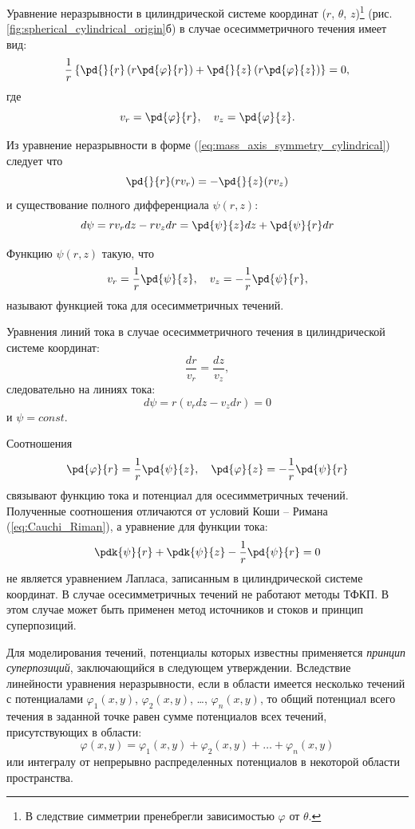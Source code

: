 \documentclass[a4paper, 14pt]{extarticle}
\begin{document}
Уравнение неразрывности в цилиндрической системе координат ($r$, $\theta$, $z$)\footnote{В следствие симметрии пренебрегли зависимостью $\varphi$ от $\theta$.} (рис. \ref{fig:spherical_cylindrical_origin}б) в случае осесимметричного течения имеет вид:
\begin{equation}
\label{eq:mass_axis_symmetry_cylindrical}
\frac{1}{r}
\left\{
\pd{}{r}\left( r \pd{\varphi}{r} \right) + 
\pd{}{z}\left( r \pd{\varphi}{z} \right)
\right\}
= 0,
\end{equation}
где
\[
v_r = \pd{\varphi}{r},\quad
v_z =  \pd{\varphi}{z}.
\]

Из уравнение неразрывности в форме (\ref{eq:mass_axis_symmetry_cylindrical}) следует что
\[
	\pd{}{r}(r v_r)  = -\pd{}{z}(r v_z)
\]	
и существование полного дифференциала $\psi(r,z)$:
\[
	d\psi = r v_r dz - r v_z dr = \pd{\psi}{z} dz + \pd{\psi}{r} dr
\]


\begin{dfn}
Функцию $\psi(r,z)$  такую, что
\[
	v_r = \displaystyle\frac{1}{r}\pd{\psi}{z},\quad
	v_z = -\displaystyle\frac{1}{r}\pd{\psi}{r},
\]
называют \alert{функцией тока для осесимметричных течений}.	
\end{dfn}

Уравнения линий тока в случае осесимметричного течения в цилиндрической системе координат:
\[
\frac{dr}{v_r} = \frac{dz}{v_z},
\]
следовательно на линиях тока:
\[
d\psi = r (v_r dz - v_z dr) = 0
\]
и $\psi = const$.

Соотношения
\[
	\pd{\varphi}{r} = \frac{1}{r}\pd{\psi}{z},\quad
	\pd{\varphi}{z} = -\frac{1}{r}\pd{\psi}{r}
\]
связывают функцию тока и потенциал для осесимметричных течений. Полученные соотношения \alert{отличаются} от условий Коши -- Римана (\ref{eq:Cauchi_Riman}), а уравнение для функции тока:
\[
	\pdk{\psi}{r}+\pdk{\psi}{z} - \frac{1}{r}\pd{\psi}{r} = 0
\]
не является уравнением Лапласа, записанным в цилиндрической системе координат. 
В случае осесимметричных течений не работают методы ТФКП. В этом случае может быть применен \alert{метод источников и стоков} и \alert{принцип суперпозиций}. 
		
Для моделирования течений, потенциалы которых известны применяется \textit{принцип суперпозиций}, заключающийся в следующем утверждении. Вследствие линейности уравнения неразрывности, если в области имеется несколько течений с потенциалами $\varphi_1(x,y)$, $\varphi_2(x,y)$, \ldots, $\varphi_n(x,y)$, то общий потенциал всего течения в заданной точке равен сумме потенциалов всех течений, присутствующих в области:
\[
\varphi(x,y) = \varphi_1(x,y) + \varphi_2(x,y) + \ldots + \varphi_n(x,y)
\] 		
или интегралу от непрерывно распределенных потенциалов в некоторой области пространства.
\end{document}
